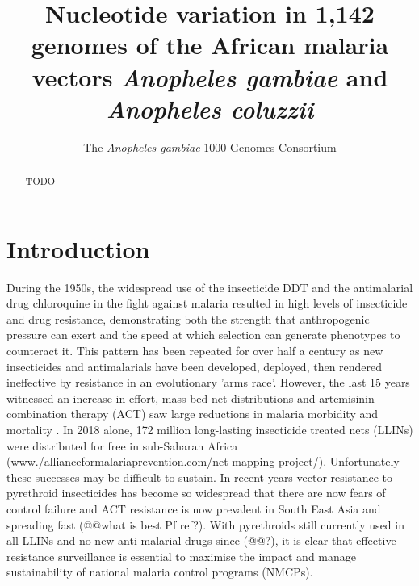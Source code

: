 \documentclass[a4paper,11pt,abstracton,hidelinks]{scrartcl}
\title{
Nucleotide variation in 1,142 genomes of the African malaria vectors \emph{Anopheles gambiae} and \emph{Anopheles coluzzii}
}
\author[1]{\small The \emph{Anopheles gambiae} 1000 Genomes Consortium}
\affil[1]{\footnotesize A list of consortium members appears at the end of the paper}
\begin{document}
\maketitle


\begin{abstract}

TODO

\end{abstract}


\section*{Introduction}


During the 1950s, the widespread use of the insecticide DDT and the antimalarial drug chloroquine in the fight against malaria resulted in high levels of insecticide and drug resistance, demonstrating both the strength that anthropogenic pressure can exert and the speed at which selection can generate phenotypes to counteract it.
%
This pattern has been repeated for over half a century as new insecticides and antimalarials have been developed, deployed, then rendered ineffective by resistance in an evolutionary 'arms race'.
%
However, the last 15 years witnessed an increase in effort, mass bed-net distributions and artemisinin combination therapy (ACT) saw large reductions in malaria morbidity and mortality \cite{Bhatt2015}.
%
In 2018 alone, 172 million long-lasting insecticide treated nets (LLINs) were distributed for free in sub-Saharan Africa (www./allianceformalariaprevention.com/net-mapping-project/).
%
Unfortunately these successes may be difficult to sustain.
%
In recent years vector resistance to pyrethroid insecticides has become so widespread that there are now fears of control failure \cite{churcher2016, Hemingway2016} and ACT resistance is now prevalent in South East Asia and spreading fast (@@what is best Pf ref?).
%
With pyrethroids still currently used in all LLINs and no new anti-malarial drugs since (@@?), it is clear that effective resistance surveillance is essential to maximise the impact and manage sustainability of national malaria control programs (NMCPs). 
\end{document}
